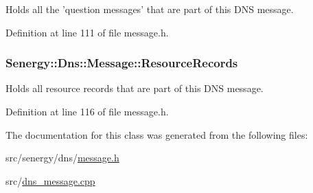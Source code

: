 Holds all the 'question messages' that are part of this D\-N\-S message. 



Definition at line 111 of file message.\-h.

\hypertarget{class_senergy_1_1_dns_1_1_message_a9c5d3af474d43d46dd1a6992567fc38b}{
\subsubsection[{Resource\-Records}]{ Senergy\-::\-Dns\-::\-Message\-::\-Resource\-Records}}\label{class_senergy_1_1_dns_1_1_message_a9c5d3af474d43d46dd1a6992567fc38b}


Holds all resource records that are part of this D\-N\-S message. 



Definition at line 116 of file message.\-h.



The documentation for this class was generated from the following files\-:\begin{DoxyCompactItemize}
\item 
src/senergy/dns/\hyperlink{message_8h}{message.\-h}\item 
src/\hyperlink{dns__message_8cpp}{dns\-\_\-message.\-cpp}\end{DoxyCompactItemize}
